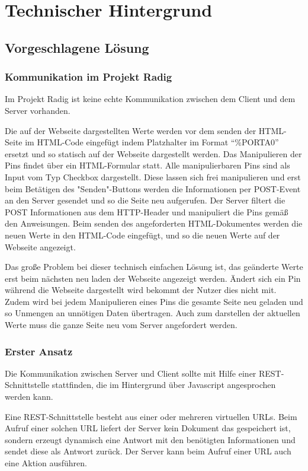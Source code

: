 \chapter{Technischer Hintergrund}

\section{Vorgeschlagene Lösung}

\subsection{Kommunikation im Projekt Radig}
Im Projekt Radig ist keine echte Kommunikation zwischen dem Client und dem Server 
vorhanden. 

Die auf der Webseite dargestellten Werte werden vor dem senden der HTML-Seite 
im HTML-Code eingefügt indem Platzhalter im Format "`\%PORTA0"' ersetzt und so statisch auf 
der Webseite dargestellt werden. Das Manipulieren der Pins findet über ein HTML-Formular 
statt. Alle manipulierbaren Pins sind als Input vom Typ Checkbox dargestellt. Diese lassen 
sich frei manipulieren und erst beim Betätigen des "Senden"-Buttons werden die 
Informationen per POST-Event an den Server gesendet und so die Seite neu aufgerufen. Der 
Server filtert die POST Informationen aus dem HTTP-Header und manipuliert die Pins gemäß 
den Anweisungen. Beim senden des angeforderten HTML-Dokumentes werden die neuen Werte in 
den HTML-Code eingefügt, und so die neuen Werte auf der Webseite angezeigt.

Das große Problem bei dieser technisch einfachen Lösung ist, das geänderte Werte erst beim 
nächsten neu laden der Webseite angezeigt werden. Ändert sich ein Pin während die Webseite 
dargestellt wird bekommt der Nutzer dies nicht mit. Zudem wird bei jedem Manipulieren 
eines Pins die gesamte Seite neu geladen und so Unmengen an unnötigen Daten übertragen. 
Auch zum darstellen der aktuellen Werte muss die ganze Seite neu vom Server angefordert 
werden.

\subsection{Erster Ansatz}
Die Kommunikation zwischen Server und Client sollte mit Hilfe einer REST-Schnittstelle 
stattfinden, die im Hintergrund über Javascript angesprochen werden kann. 

Eine REST-Schnittstelle besteht aus einer oder mehreren virtuellen URLs. Beim Aufruf einer 
solchen URL liefert der Server kein Dokument das gespeichert ist, sondern erzeugt 
dynamisch eine Antwort mit den benötigten Informationen und sendet diese als Antwort 
zurück. Der Server kann beim Aufruf einer URL auch eine Aktion ausführen.

